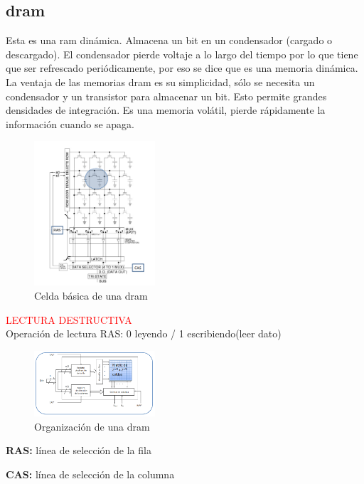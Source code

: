 \subsection{\gls{dram}}
Esta es una \gls{ram} dinámica. Almacena un bit en un condensador (cargado o descargado). El condensador pierde voltaje a lo largo del tiempo por lo que tiene que ser refrescado periódicamente, por eso se dice que es una memoria dinámica. La ventaja de las memorias \gls{dram} es su simplicidad, sólo se necesita un condensador y un transistor para almacenar un bit. Esto permite grandes densidades de integración. Es una memoria volátil, pierde rápidamente la información cuando se apaga.
\begin{multicols}{2}
	\begin{figure}[H]
		\centering
		\includegraphics[width=0.4\textwidth]{images/Tema_5/Celda_Basica_Dram.PNG}
		\caption{Celda básica de una \gls{dram}}
	\end{figure}
	\textcolor{red}{LECTURA DESTRUCTIVA}\\
	Operación de lectura RAS: 0 leyendo / 1 escribiendo(leer dato)
	\vfill
	\null
	\begin{figure}[H]
		\centering
		\includegraphics[width=0.4\textwidth]{images/Tema_5/Organizacion_Dram.PNG}
		\caption{Organización de una \gls{dram}}
	\end{figure}
	\textbf{RAS:} línea de selección de la fila

	\textbf{CAS:} línea de selección de la columna
\end{multicols}

